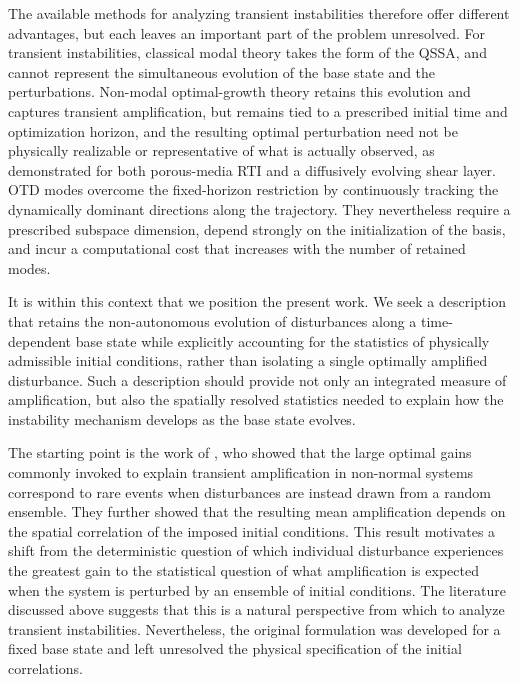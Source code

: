 The available methods for analyzing transient instabilities therefore offer different advantages, but each leaves an important part of the problem unresolved. For transient instabilities, classical modal theory takes the form of the QSSA, and cannot represent the simultaneous evolution of the base state and the perturbations. Non-modal optimal-growth theory retains this evolution and captures transient amplification, but remains tied to a prescribed initial time and optimization horizon, and the resulting optimal perturbation need not be physically realizable or representative of what is actually observed, as demonstrated for both porous-media RTI and a diffusively evolving shear layer. OTD modes overcome the fixed-horizon restriction by continuously tracking the dynamically dominant directions along the trajectory. They nevertheless require a prescribed subspace dimension, depend strongly on the initialization of the basis, and incur a computational cost that increases with the number of retained modes.

It is within this context that we position the present work. We seek a description that retains the non-autonomous evolution of disturbances along a time-dependent base state while explicitly accounting for the statistics of physically admissible initial conditions, rather than isolating a single optimally amplified disturbance. Such a description should provide not only an integrated measure of amplification, but also the spatially resolved statistics needed to explain how the instability mechanism develops as the base state evolves.


The starting point is the work of \citet{frame-towne-2024}, who showed that the large optimal gains commonly invoked to explain transient amplification in non-normal systems correspond to rare events when disturbances are instead drawn from a random ensemble. They further showed that the resulting mean amplification depends on the spatial correlation of the imposed initial conditions. This result motivates a shift from the deterministic question of which individual disturbance experiences the greatest gain to the statistical question of what amplification is expected when the system is perturbed by an ensemble of initial conditions. The literature discussed above suggests that this is a natural perspective from which to analyze transient instabilities. Nevertheless, the original formulation was developed for a fixed base state and left unresolved the physical specification of the initial correlations.
